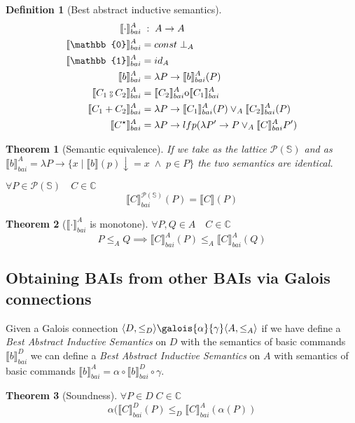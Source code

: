 \documentclass{article}
\newtheorem{definition}{Definition}
\newtheorem{theorem}{Theorem}
\def\rr{\rightarrow}
\newcommand*{\sem}[1]{
    \llbracket #1 \rrbracket
}
\newcommand{\bca}[2]{
    #2_{bai}^{#1}
}
\newcommand{\bsem}[2][A]{
    \bca{#1}{\sem{#2}}
}
\def\fcmp{\mathbin{\raise 0.6ex\hbox{\oalign{\hfil$\scriptscriptstyle      
    \mathrm{o}$\hfil\cr\hfil$\scriptscriptstyle\mathrm{9}$\hfil}}}}
\def\ocirc{\mathrm{o}}
\def\rr{\rightarrow}
\def\lang{\mathbb{C}}
\def\state{\mathbb{S}}
\begin{document}
    \begin{definition}[Best abstract inductive semantics]
        \begin{align*}
            \bsem{\cdot}         & \;:\; A \rr A \\
            \bsem{\mathbb{0}}    &= const \; \bot_A \\
            \bsem{\mathbb{1}}    &= id_A \\
            \bsem{b}             &= \lambda P \rr \bsem{b}(P) \\
            \bsem{C_1 \fcmp C_2} &= \bsem{C_2} \ocirc \bsem{C_1} \\
            \bsem{C_1 + C_2}     &= \lambda P \rr 
                \bsem{C_1}(P) \lor_A \bsem{C_2}(P) \\
            \bsem{C^\star}       &= \lambda P \rr lfp(\lambda P' \rr
                P \lor_A \bsem{C} P')
        \end{align*}
    \end{definition}


    \begin{theorem}[Semantic equivalence]
        If we take as the lattice $\mathcal{P}(\state)$ and as $\bsem{b} = \lambda P 
        \rr \{ x \mid \sem{b}(p)\downarrow = x \; \land \; p \in P \}$ the two 
        semantics are identical.

        $\forall P \in \mathcal{P}(\state) \quad C \in \lang$
        $$\bsem[\mathcal{P}(\state)]{C}(P) = \sem{C}(P)$$
    \end{theorem}
    
    \begin{theorem}[$\bsem{\cdot}$ is monotone]
        $\forall P, Q \in A \quad C \in \lang$
        $$P \leq_A Q \implies \bsem{C}(P) \leq_A \bsem{C}(Q)$$
    \end{theorem}

\subsection{Obtaining BAIs from other BAIs via Galois connections}
    Given a Galois connection $\langle D, \leq_D \rangle \galois{\alpha}{\gamma}
    \langle A, \leq_A \rangle$ if we have define a \textit{Best Abstract 
    Inductive Semantics} on $D$ with the semantics of basic commands 
    $\bsem[D]{b}$ we can define a \textit{Best Abstract Inductive Semantics} 
    on $A$ with semantics of basic commands $\bsem[A]{b} = \alpha \circ 
    \bsem[D]{b} \circ \gamma$.

    \begin{theorem}[Soundness]
        $\forall {P \in D} \; C \in \lang$
        $$\alpha(\bsem[D]{C}(P) \leq_D \bsem[A]{C}(\alpha(P))$$
    \end{theorem}
\end{document}
